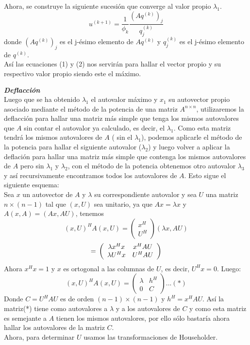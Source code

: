 \documentclass[12pt,a4paper]{article}
\begin{document}
\begin{multicols}{2}
Ahora, se construye la siguiente sucesión que converge al valor propio $\lambda_{1}$.
\begin{equation}\label{eigenvalue_iter}
u^{(k+1)} = \frac{1}{\phi_{k}}\frac{(Aq^{(k)})_{j}}{q^{(k)}_{j}}
\end{equation}
donde $(Aq^{(k)})_{j}$ es el j-ésimo elemento de $Aq^{(k)}$ y $q^{(k)}_{j}$ es el j-ésimo elemento de $q^{(k)}.$\\
Así las ecuaciones (1) y (2) nos servirán para hallar el vector propio y su respectivo valor propio siendo este el máximo.


\noindent\textbf{\textit{Deflacción}}\\
\noindent Luego que se ha obtenido $\lambda_{1}$ el autovalor máximo y $x_{1}$ su autovector propio asociado mediante el método de la potencia de una matriz $A^{n\times n}$, utilizaremos la deflacción para hallar una matriz más simple que tenga los mismos autovalores que $A$ sin contar el autovalor ya calculado, es decir, el $\lambda_{1}$. Como esta matriz tendrá los mismos autovalores de $A$ ( sin el $\lambda_{1}$), podemos aplicarle el método de la potencia para hallar el siguiente autovalor ($\lambda_{2}$) y luego volver a aplicar la deflación para hallar una matriz más simple que contenga los mismos autovalores de $A$ pero sin $\lambda_{1}$ y $\lambda_{2}$, con el método de la potencia obtenemos otro autovalor $\lambda_{3}$ y así recursivamente encontramos todos los autovalores de $A$.
Esto sigue el siguiente esquema:\\
Sea $x$ un autovector de $A$ y $\lambda $ su correspondiente autovalor y sea $U$ una matriz $n\times(n-1)$ tal que $(x,U)$ sea unitario, ya que $Ax=\lambda x$ y $A(x,A)=(Ax,AU)$, tenemos$$(x,U)^{H}A(x,U)=\left(\begin{array}{c}
    x^{H} \\
     U^{H} 
\end{array}\right)\left(\lambda x,AU\right)$$ $$=\newline \left(\begin{array}{cc}
   \lambda x^{H}x  &  x^{H}AU\\
   \lambda U^{H}x  & U^{H}AU
\end{array}\right)$$
Ahora $x^{H}x=1$  y $x$ es ortogonal a las columnas de $U$, es decir, $U^{H}x=0$. Luego:\\
$$(x,U)^{H}A(x,U)=\left(\begin{array}{cc}
  \lambda   &  h^{H}\\
    0 & C
\end{array}\right)...(*)$$ Donde $C=U^{H}AU$ es de orden  $(n-1)\times (n-1)$ y $h^{H}=x^{H}AU$. Así la matriz(*) tiene como autovalores a $\lambda$ y a los autovalores de $C$ y como esta matriz es semejante a $A$ tienen los mismos autovalores, por ello sólo bastaría ahora hallar los autovalores de la matriz $C$.\\
Ahora, para determinar $U$ usamos las transformaciones de Householder.\\


\end{multicols}
\end{document}
